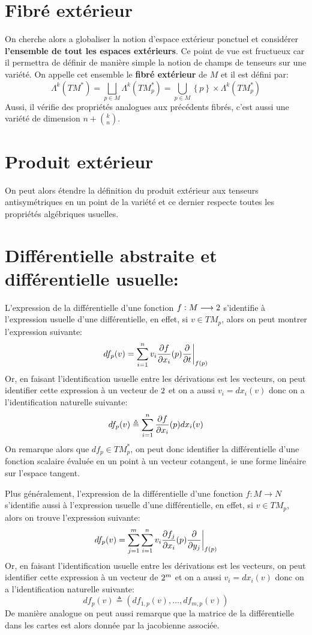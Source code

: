    \section{Fibré extérieur}
      On cherche alors a globaliser la notion d'espace extérieur ponctuel et considérer \textbf{l'ensemble de tout les espaces extérieurs}. Ce point de vue est fructueux car il permettra de définir de manière simple la notion de champs de tenseurs sur une variété. On appelle cet ensemble le \textbf{fibré extérieur} de \( M \) et il est défini par:
      \[ 
         \Lambda^k(TM^*) = \bigsqcup_{p \in M} \Lambda^k(TM_p^*) = \bigcup_{p \in M} \left\{ p \right\} \times \Lambda^k(TM_p^*) 
      \]
      Aussi, il vérifie des propriétés analogues aux précédents fibrés, c'est aussi une variété de dimension \( n + \binom{k}{n} \). 
   \section{Produit extérieur}
      On peut alors étendre la définition du produit extérieur aux tenseurs antisymétriques en un point de la variété et ce dernier respecte toutes les propriétés algébriques usuelles.
   \section{Différentielle abstraite et différentielle usuelle:}
      L'expression de la différentielle d'une fonction \( f : M \longrightarrow 2 \) s'identifie à l'expression usuelle d'une différentielle, en effet, si \( v \in TM_p \), alors on peut montrer l'expression suivante:
      \[ 
         df_p(v) = \sum_{i=1}^n v_i \frac{\partial f}{\partial x_i}(p)\frac{\partial }{\partial t}\biggr|_{f(p)}
      \]
      Or, en faisant l'identification usuelle entre les dérivations est les vecteurs, on peut identifier cette expression à un vecteur de \(2\) et on a aussi \( v_i = dx_i(v) \) donc on a l'identification naturelle suivante:
      \[ 
         df_p(v) \triangleq \sum_{i=1}^n \frac{\partial f}{\partial x_i}(p)dx_i(v)
      \]
      On remarque alors que \( df_p \in TM^*_p \), on peut donc identifier la différentielle d'une fonction scalaire évaluée en un point à un vecteur cotangent, ie une forme linéaire sur l'espace tangent.\<

      Plus généralement, l'expression de la différentielle d'une fonction \( f : M \longrightarrow N \) s'identifie aussi à l'expression usuelle d'une différentielle, en effet, si \( v \in TM_p \), alors on trouve l'expression suivante:
      \[ 
         df_p(v) = \sum_{j=1}^m\sum_{i=1}^n v_i \frac{\partial f_j}{\partial x_i}(p)\frac{\partial }{\partial y_j}\biggr|_{f(p)}
      \]
      Or, en faisant l'identification usuelle entre les dérivations est les vecteurs, on peut identifier cette expression à un vecteur de \(2^m\) et on a aussi \( v_i = dx_i(v) \) donc on a l'identification naturelle suivante:
      \[ 
         df_p(v) \triangleq (df_{1, p}(v), \ldots, df_{m, p}(v))
      \]
      De manière analogue on peut aussi remarque que la matrice de la différentielle dans les cartes est alors donnée par la jacobienne associée.

